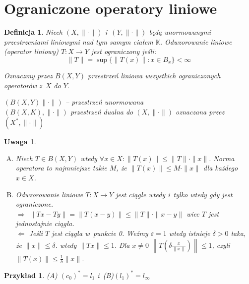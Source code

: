 \documentclass[11pt]{mwrep}
\renewcommand{\[}{\begin{equation}}
\renewcommand{\]}{\end{equation}}
\newcommand{\K}{\ensuremath{\mathbb{K}}}
\newcommand{\norm}{\|\cdot\|}
\newtheorem{uwaga}[subsection]{Uwaga}
\newtheorem{de}[subsection]{Definicja}
\newtheorem{ex}[subsection]{Przykład}
\newcounter{numer}
\begin{document}
\section{Ograniczone operatory liniowe}
\begin{de}
Niech $(X,\norm)$ i~$(Y,\norm)$ będą unormowanymi przestrzeniami liniowymi nad tym samym ciałem \K.
Odwzorowanie liniowe (operator liniowy) $T\colon X \to Y$ jest ograniczony jeśli:
$$\| T\| = \sup \{\|T(x)\|\colon x \in B_x\} < \infty$$

Oznaczmy przez $B(X,Y)$ przestrzeń liniowa wszystkich ograniczonych operatorów z~$X$ do $Y$.

$(B(X,Y) \norm)$ -- przestrzeń unormowana \\
$(B(X,K), \norm)$ przestrzeń dualna do $(X,\norm)$ oznaczana przez $(X^*,\norm)$
\end{de}
\begin{uwaga}
	\begin{enumerate}[(A)]
		\item Niech $T\in B(X,Y)$ wtedy $\forall x\in X: \|T(x)\| \le \|T\| \cdot \|x\|$. 
			Norma operatora to najmniejsze takie $M$, że $\|T(x)\| \le M \cdot \|x\|$ dla każdego $x\in X$.
		\item Odwzorowanie liniowe $T\colon X \to Y$ jest ciągłe wtedy i~tylko wtedy gdy jest ograniczone.\\
			$\Rightarrow$ $\|Tx-Ty\| = \|T(x-y)\| \le \|T\| \cdot \|x - y\|$ wiec $T$ jest jednostajnie ciągła.\\
			$\Leftarrow$ Jeśli $T$ jest ciągła w~punkcie 0. Weźmy $\varepsilon=1$ wtedy istnieje $\delta>0$ taka, że $\|x\|\le \delta$.
			wtedy $\|Tx\|\le 1$.
			Dla $x\not =  0$ $\left\|T\left( \delta \frac{x}{\|x\|} \right)\right\|\le 1$, czyli $\|T(x)\|\le \frac{1}{\delta}\|x\|$.

	\end{enumerate}
\end{uwaga}
\begin{ex}	
	\textup{(A)} $(c_0)^* = l_1$ i~\textup{(B)}$(l_1)^* = l_\infty$
\end{ex}
\end{document}
